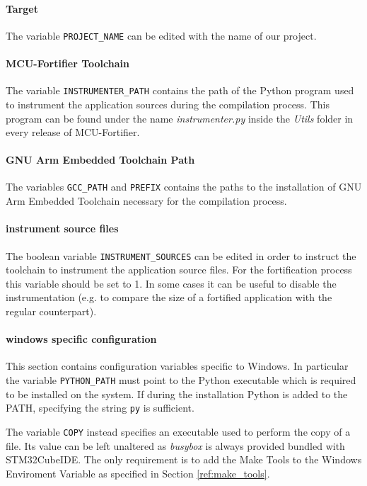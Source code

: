 \documentclass{article}
\begin{document}
\paragraph{Target} The variable \verb|PROJECT_NAME| can be edited with the name of our project.

\paragraph{MCU-Fortifier Toolchain} The variable \verb|INSTRUMENTER_PATH| contains the path of the Python program used to instrument the application sources during the compilation process. This program can be found under the name \textit{instrumenter.py} inside the \textit{Utils} folder in every release of MCU-Fortifier.

\paragraph{GNU Arm Embedded Toolchain Path} The variables \verb|GCC_PATH| and \verb|PREFIX| contains the paths to the installation of GNU Arm Embedded Toolchain necessary for the compilation process.

\paragraph{instrument source files} The boolean variable \verb|INSTRUMENT_SOURCES| can be edited in order to instruct the toolchain to instrument the application source files. For the fortification process this variable should be set to 1. In some cases it can be useful to disable the instrumentation (e.g. to compare the size of a fortified application with the regular counterpart).

\paragraph{windows specific configuration} This section contains configuration variables specific to Windows. In particular the variable \verb|PYTHON_PATH| must point to the Python executable which is required to be installed on the system. If during the installation Python is added to the PATH, specifying the string \verb|py| is sufficient.

The variable \verb|COPY| instead specifies an executable used to perform the copy of a file. Its value can be left unaltered as \textit{busybox} is always provided bundled with STM32CubeIDE. The only requirement is to add the Make Tools to the Windows Enviroment Variable as specified in Section \ref{ref:make_tools}.
\end{document}
